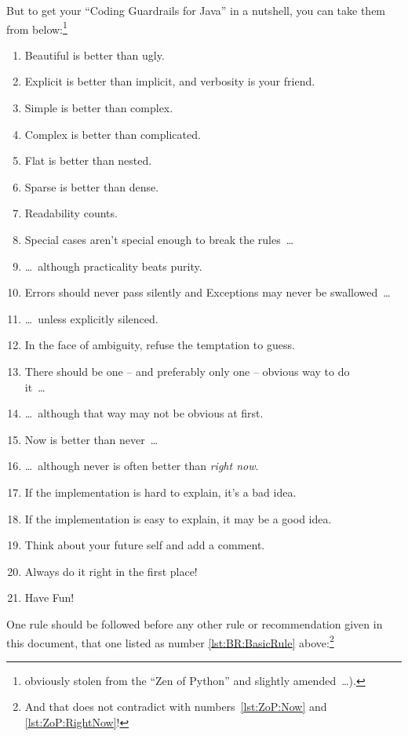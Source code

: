 But to get your “Coding Guardrails for Java” in a nutshell, you can take them from below:\footnote{obviously stolen from the “Zen of Python”\autocite{WIKIPEDIA:ZenOfPython,PYTHON_ORG_MAILING_LIST:ThePythonWay} and slightly amended~…).}
\begin{enumerate}[nosep]
\item Beautiful is better than ugly.
\item Explicit is better than implicit, and verbosity is your friend.\label{lst:ZoP:ExplicitVsImplicit}
\item Simple is better than complex.\label{lst:ZoP:SimpleVsComplex}
\item Complex is better than complicated.\label{lst:ZoP:ComplexVsComplicated}
\item Flat is better than nested.
\item Sparse is better than dense.
\item Readability counts.\label{lst:ZoP:Readablity}
\item Special cases aren't special enough to break the rules~…\label{lst:ZoP:SpecialCases}
\item …~although practicality beats purity.\label{lst:ZoP:Practicality}
\item Errors should never pass silently and Exceptions may never be swallowed~…
\item …~unless explicitly silenced.
\item In the face of ambiguity, refuse the temptation to guess.
\item There should be one – and preferably only one – obvious way to do\\ it~…
\item …~although that way may not be obvious at first.
\item Now is better than never~…\label{lst:ZoP:Now}
\item …~although never is often better than \textit{right now}.\label{lst:ZoP:RightNow}
\item If the implementation is hard to explain, it's a bad idea.
\item If the implementation is easy to explain, it may be a good idea.
\item Think about your future self and add a comment.
\item Always do it right in the first place!\label{lst:BR:BasicRule}
\item Have Fun!
\end{enumerate}

One rule should be followed before any other rule or recommendation given in this document, that one listed as number \ref{lst:BR:BasicRule} above:\footnote{And that does not contradict with numbers~\ref{lst:ZoP:Now} and \ref{lst:ZoP:RightNow}!}


